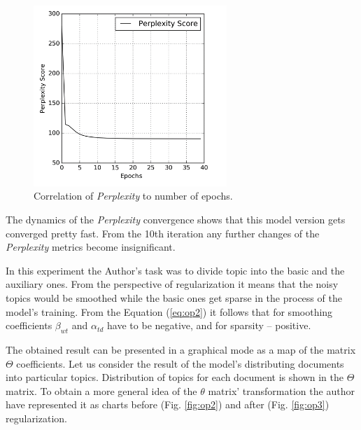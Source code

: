 \documentclass[12pt]{report}
\theoremstyle{definition}
\begin{document}
\begin{figure}
	\centering
	\includegraphics[width=0.65\textwidth]{op3fig1eng.png}
	\caption{Correlation of \textit{Perplexity} to number of epochs.}
	\label{fig:op1}
\end{figure}

The dynamics of the \textit{Perplexity} convergence shows that this model version gets converged pretty fast. From the 10th iteration any further changes of the \textit{Perplexity} metrics become insignificant.

In this experiment the Author's task was to divide topic into the basic and the auxiliary ones. 
From the perspective of regularization it means that the noisy topics would be smoothed while the basic ones get sparse in the process of the model's training. 
From the Equation (\ref{eq:op2}) it follows that for smoothing coefficients $\beta_{wt} $ and $\alpha_{td}$ have to be negative, and for sparsity -- positive. 

The obtained result can be presented in a graphical mode as a map of the matrix $\Theta$ coefficients. 
Let us consider the result of the model's distributing documents into particular topics. 
Distribution of topics for each document is shown in the $\Theta$ matrix.  
To obtain a more general idea of the $\theta$ matrix' transformation the author have represented it as charts before (Fig. \ref{fig:op2}) and after (Fig. \ref{fig:op3}) regularization.
\end{document}
